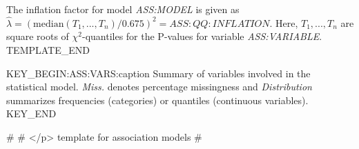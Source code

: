 The inflation factor for model \emph{ASS:MODEL} is given as $\hat \lambda = (\mathrm{median}(T_1, ..., T_n)/0.675)^2 = ASS:QQ:INFLATION$. Here, $T_1, ..., T_n$ are square roots of $\chi^2$-quantiles for the P-values for variable \emph{ASS:VARIABLE}.
TEMPLATE_END

KEY_BEGIN:ASS:VARS:caption
Summary of variables involved in the statistical model. {\it Miss.} denotes percentage missingness and {\it Distribution} summarizes frequencies (categories) or quantiles (continuous variables).
KEY_END

#
#	</p> template for association models
#
